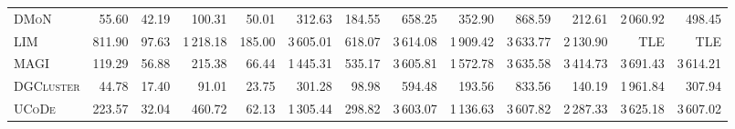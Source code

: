 \documentclass[../paper.tex]{subfiles}
\begin{document}
\begin{table}[H]
\begin{tabular}{l|rr|rr|rr|rr|rr|rr}
        \textsc{DMoN}      & 55.60                     & 42.19                         & 100.31                         & 50.01                         & 312.63                         & 184.55                          & 658.25                    & 352.90                        & 868.59                    & 212.61                        & 2\,060.92                 & 498.45                       \\
        \textsc{LIM}       & 811.90                    & 97.63                         & 1\,218.18                      & 185.00                        & 3\,605.01                      & 618.07                          & 3\,614.08                 & 1\,909.42                     & 3\,633.77                 & 2\,130.90                     & TLE                       & TLE                          \\
        \textsc{MAGI}      & 119.29                    & 56.88                         & 215.38                         & 66.44                         & 1\,445.31                      & 535.17                          & 3\,605.81                 & 1\,572.78                     & 3\,635.58                 & 3\,414.73                     & 3\,691.43                 & 3\,614.21                    \\
        \textsc{DGCluster} & 44.78                     & 17.40                         & 91.01                          & 23.75                         & 301.28                         & 98.98                           & 594.48                    & 193.56                        & 833.56                    & 140.19                        & 1\,961.84                 & 307.94                       \\
        \textsc{UCoDe}     & 223.57                    & 32.04                         & 460.72                         & 62.13                         & 1\,305.44                      & 298.82                          & 3\,603.07                 & 1\,136.63                     & 3\,607.82                 & 2\,287.33                     & 3\,625.18                 & 3\,607.02                    \\
        \bottomrule
    \end{tabular}
\end{table}

\ifSubfilesClassLoaded{%
}{}
\end{document}
